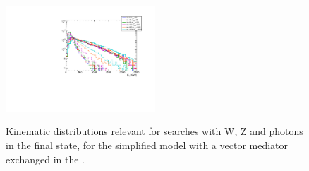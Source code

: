 \begin{figure}[h!]
{	\includegraphics[width=0.5\textwidth]{figures/EW/monoWhad_Destructive/metPt}
}    
\caption{Kinematic distributions relevant for searches with W, Z and photons in the final state, 
for the simplified model
       with a vector mediator exchanged in the \schannel.}
\label{fig:DMV_EW_kinematics_SVMed}
\end{figure}
